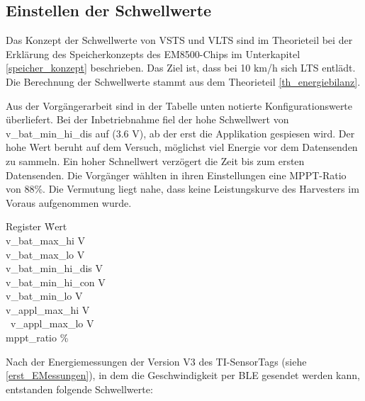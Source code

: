 
\subsection{Einstellen der Schwellwerte}
\label{v_schwellwerte}

Das Konzept der Schwellwerte von VSTS und VLTS sind im Theorieteil bei der Erklärung des Speicherkonzepts des EM8500-Chips im Unterkapitel \ref{speicher_konzept} beschrieben. Das Ziel ist, dass bei 10 km/h sich LTS entlädt. Die Berechnung der Schwellwerte stammt aus dem Theorieteil \ref{th_energiebilanz}.

Aus der Vorgängerarbeit sind in der Tabelle unten notierte Konfigurationswerte überliefert. Bei der Inbetriebnahme fiel der hohe Schwellwert von v\_bat\_min\_hi\_dis auf (3.6 V), ab der erst die Applikation gespiesen wird. Der hohe Wert beruht auf dem Versuch, möglichst viel Energie vor dem Datensenden zu sammeln. Ein hoher Schnellwert verzögert die Zeit bis zum ersten Datensenden. Die Vorgänger wählten in ihren Einstellungen eine MPPT-Ratio von 88\thinspace\%. Die Vermutung liegt nahe, dass keine Leistungskurve des Harvesters im Voraus aufgenommen wurde.

\begin{minipage}{\textwidth}
    \begin{tabbing}
    Register \hspace{4cm} \quad\= Wert \\[0.8ex]
    v\_bat\_max\_hi        V \\
    v\_bat\_max\_lo        V \\
    v\_bat\_min\_hi\_dis   V \\
    v\_bat\_min\_hi\_con   V \\
    v\_bat\_min\_lo        V \\
    v\_appl\_max\_hi       V \\\
    v\_appl\_max\_lo       V \\ 
    mppt\_ratio            \thinspace\% \\
    \end{tabbing}
\end{minipage}

Nach der Energiemessungen der Version V3 des TI-SensorTags (siehe \ref{erst_EMessungen}), in dem die Geschwindigkeit per BLE gesendet werden kann, entstanden folgende Schwellwerte:

